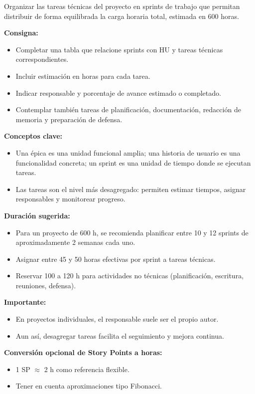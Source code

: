 \documentclass[
11pt, %
]{charter}
\begin{document}
Organizar las tareas técnicas del proyecto en sprints de trabajo que permitan distribuir de forma equilibrada la carga horaria total, estimada en 600 horas.

\textbf{Consigna:}
\begin{itemize}
  \item Completar una tabla que relacione sprints con HU y tareas técnicas correspondientes.
  \item Incluir estimación en horas para cada tarea.
  \item Indicar responsable y porcentaje de avance estimado o completado.
  \item Contemplar también tareas de planificación, documentación, redacción de memoria y preparación de defensa.
\end{itemize}

\textbf{Conceptos clave:}
\begin{itemize}
  \item Una \'{e}pica es una unidad funcional amplia; una historia de usuario es una funcionalidad concreta; un sprint es una unidad de tiempo donde se ejecutan tareas.
  \item Las tareas son el nivel más desagregado: permiten estimar tiempos, asignar responsables y monitorear progreso.
\end{itemize}

\textbf{Duración sugerida:}
\begin{itemize}
  \item Para un proyecto de 600 h, se recomienda planificar entre 10 y 12 sprints de aproximadamente 2 semanas cada uno.
  \item Asignar entre 45 y 50 horas efectivas por sprint a tareas técnicas.
  \item Reservar 100 a 120 h para actividades no técnicas (planificación, escritura, reuniones, defensa).
\end{itemize}

\textbf{Importante:}
\begin{itemize}
  \item En proyectos individuales, el responsable suele ser el propio autor.
  \item Aun así, desagregar tareas facilita el seguimiento y mejora continua.
\end{itemize}

\textbf{Conversión opcional de Story Points a horas:}
\begin{itemize}
  \item 1 SP \(\approx\) 2 h como referencia flexible.
  \item Tener en cuenta aproximaciones tipo Fibonacci.
\end{itemize}
\end{document}
